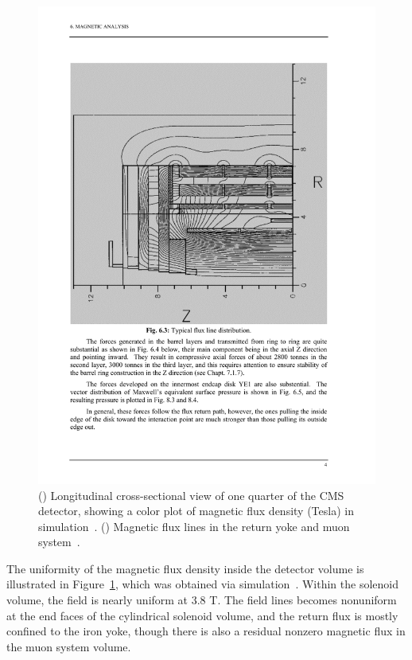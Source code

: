 \begin{figure}[hbtp]
\begin{center}
    \includegraphics[width=1.24\cmsFigWidth]{figures/cms-magneticfluxinyoke}
    \caption{(\cmsLeft) Longitudinal cross-sectional view of one quarter of the CMS detector, showing a color plot of magnetic flux density (Tesla) in simulation~\cite{Amapane:883293}. (\cmsRight) Magnetic flux lines in the return yoke and muon system~\cite{Acquistapace:1997fm}.}
    \label{fig:cms-magneticfield}
  \end{center}
\end{figure}

The uniformity of the magnetic flux density inside the detector volume is illustrated in Figure~\ref{fig:cms-magneticfield}, which was obtained via simulation~\cite{Amapane:883293}. Within the solenoid volume, the field is nearly uniform at 3.8 T. The field lines becomes nonuniform at the end faces of the cylindrical solenoid volume, and the return flux is mostly confined to the iron yoke, though there is also a residual nonzero magnetic flux in the muon system volume.

